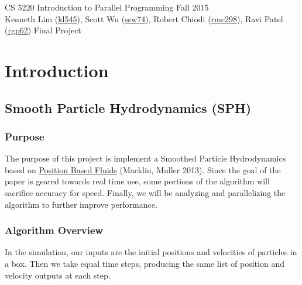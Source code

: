 \documentclass{scrartcl}
\begin{document}
    \begin{frame}
    CS 5220 Introduction to Parallel Programming \hfill Fall 2015 \\
    Kenneth Lim (\href{mailto:kl545@cornell.edu}{kl545}), Scott Wu (\href{mailto:ssw74@cornell.edu}{ssw74}), Robert Chiodi (\href{mailto:rmc298@cornell.edu}{rmc298}), Ravi Patel (\href{mailto:rgp62@cornell.edu}{rgp62})  \hfill Final Project \hspace{-3ex}
    \end{frame}


    \section{Introduction}

    \subsection{Smooth Particle Hydrodynamics (SPH)}

    \subsubsection{Purpose}
    The purpose of this project is implement a Smoothed Particle Hydrodynamics based on \href{http://mmacklin.com/pbf\_sig\_preprint.pdf}{Position Based Fluids} (Macklin, Muller 2013). Since the goal of the paper is geared towards real time use, some portions of the algorithm will sacrifice accuracy for speed. Finally, we will be analyzing and parallelizing the algorithm to further improve performance.

    \subsubsection{Algorithm Overview}

    In the simulation, our inputs are the initial positions and velocities of particles in a box. Then we take equal time steps, producing the same list of position and velocity outputs at each step.
\end{document}
